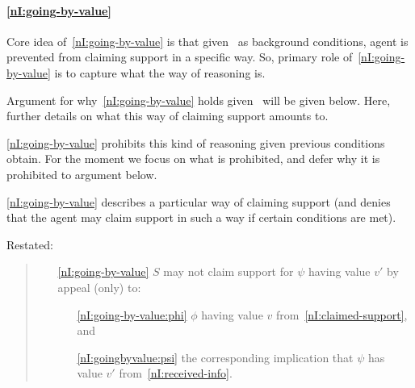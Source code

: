 \paragraph{\ref{nI:going-by-value}}

\begin{note}
  Core idea of~\ref{nI:going-by-value} is that given~\nIOTT{} as background conditions, agent is prevented from claiming support in a specific way.
  So, primary role of~\ref{nI:going-by-value} is to capture what the way of reasoning is.

  Argument for why~\ref{nI:going-by-value} holds given~\nIOTT{} will be given below.
  Here, further details on what this way of claiming support amounts to.

  \ref{nI:going-by-value} prohibits this kind of reasoning given previous conditions obtain.
  For the moment we focus on what is prohibited, and defer why it is prohibited to argument below.
\end{note}

\begin{note}
  \ref{nI:going-by-value} describes a particular way of claiming support (and denies that the agent may claim support in such a way if certain conditions are met).

  Restated:
  \color{blue}
  \begin{quote}
    \begin{enumerate}
    \item[\ref{nI:going-by-value}] \(S\) may not claim support for \(\psi\) having value \(v'\) by appeal (only) to:
      \begin{enumerate}[label=\alph*.]
      \item[\ref{nI:going-by-value:phi}] \(\phi\) having value \(v\) from~\ref{nI:claimed-support}, and
      \item[\ref{nI:goingbyvalue:psi}] the corresponding implication that \(\psi\) has value \(v'\) from~\ref{nI:received-info}.
      \end{enumerate}
    \end{enumerate}
  \end{quote}
\end{note}

